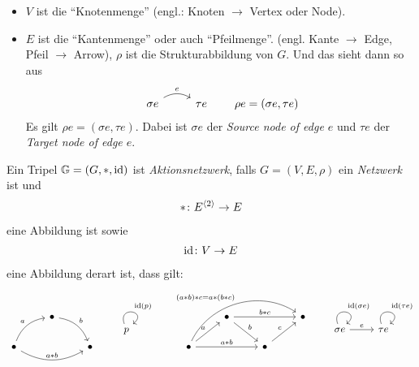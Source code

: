\begin{interpret}
    \begin{itemize}
        \item $V$ ist die ``Knotenmenge'' (engl.: Knoten $\to$ Vertex oder Node).
        \item $E$ ist die ``Kantenmenge'' oder auch ``Pfeilmenge''. (engl. Kante $\to$ Edge, Pfeil $\to$ Arrow), $\rho$ ist die Strukturabbildung von $G$. Und das sieht dann so aus
        $$
        \begin{tikzcd}
            \sigma e \arrow[r, "e", bend left] & \tau e
        \end{tikzcd} \qquad\rho e = (\sigma e , \tau e)
        $$
        Es gilt $\rho e = (\sigma e, \tau e)$. Dabei ist $\sigma e$ der \emph{Source node of edge $e$} und $\tau e$ der \emph{Target node of edge $e$}.
    \end{itemize}
\end{interpret}
\begin{definition}\label{def_action_network}
    Ein Tripel $\mathbb{G} = (G, \ast, \operatorname{id})$ ist \emph{Aktionsnetzwerk}, falls $G = (V,E,\rho)$ ein \emph{Netzwerk} ist und
    \begin{align*}
        \ast\colon E^{\langle 2\rangle} \to E
    \end{align*}
    eine Abbildung ist sowie
    \begin{align*}
        \operatorname{id} \colon V \to E
    \end{align*}
    eine Abbildung derart ist, dass gilt:
    $$
        \begin{tikzcd}                                        & \bullet \arrow[rd, "b", bend left] &         \\
            \bullet \arrow[ru, "a", bend left] \arrow[rr, "a \ast b", bend right] &                                    & \bullet
        \end{tikzcd} \qquad
        \begin{tikzcd}
            p \arrow["\id(p)", loop, distance=2em, in=40, out=110]
        \end{tikzcd} \qquad
        \begin{tikzcd}
            & \bullet \arrow[rr, "b \ast c"] \arrow[rd, "b"] &                         & \bullet \\
            \bullet \arrow[ru, "a"] \arrow[rr, "a \ast b"] \arrow[rrru, "(a \ast b) \ast c = a\ast (b \ast c)", bend left=49] &                                                & \bullet \arrow[ru, "c"] &        
        \end{tikzcd} \qquad
        \begin{tikzcd}
            \sigma e \arrow[r, "e"] \arrow["\id(\sigma e)", loop, distance=2em, in=40, out=110] & \tau e \arrow["\id(\tau e)", loop, distance=2em, in=40, out=110]
        \end{tikzcd}
    $$
\end{definition}
